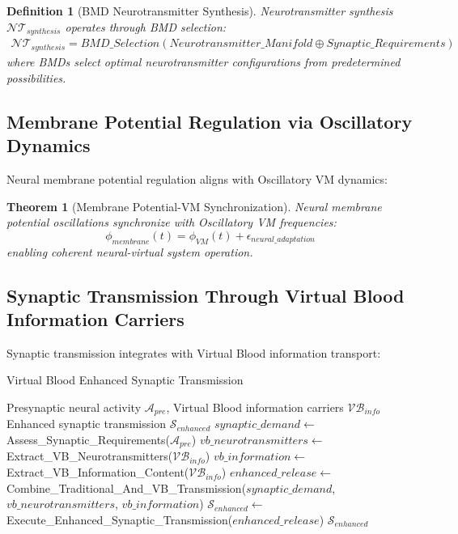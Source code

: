 \documentclass[12pt,a4paper]{article}
\newtheorem{theorem}{Theorem}
\newtheorem{definition}{Definition}
\begin{document}
\begin{definition}[BMD Neurotransmitter Synthesis]
Neurotransmitter synthesis $\mathcal{NT}_{synthesis}$ operates through BMD selection:
\begin{align}
\mathcal{NT}_{synthesis} = BMD\_Selection(Neurotransmitter\_Manifold \oplus Synaptic\_Requirements)
\end{align}
where BMDs select optimal neurotransmitter configurations from predetermined possibilities.
\end{definition}

\subsection{Membrane Potential Regulation via Oscillatory Dynamics}

Neural membrane potential regulation aligns with Oscillatory VM dynamics:

\begin{theorem}[Membrane Potential-VM Synchronization]
Neural membrane potential oscillations synchronize with Oscillatory VM frequencies:
\begin{equation}
\phi_{membrane}(t) = \phi_{VM}(t) + \epsilon_{neural\_adaptation}
\end{equation}
enabling coherent neural-virtual system operation.
\end{theorem}

\subsection{Synaptic Transmission Through Virtual Blood Information Carriers}

Synaptic transmission integrates with Virtual Blood information transport:

\begin{algorithm}
\caption{Virtual Blood Enhanced Synaptic Transmission}
\begin{algorithmic}[1]
\REQUIRE Presynaptic neural activity $\mathcal{A}_{pre}$, Virtual Blood information carriers $\mathcal{VB}_{info}$
\ENSURE Enhanced synaptic transmission $\mathcal{S}_{enhanced}$
\STATE $synaptic\_demand \leftarrow$ Assess\_Synaptic\_Requirements($\mathcal{A}_{pre}$)
\STATE $vb\_neurotransmitters \leftarrow$ Extract\_VB\_Neurotransmitters($\mathcal{VB}_{info}$)
\STATE $vb\_information \leftarrow$ Extract\_VB\_Information\_Content($\mathcal{VB}_{info}$)
\STATE $enhanced\_release \leftarrow$ Combine\_Traditional\_And\_VB\_Transmission($synaptic\_demand$, $vb\_neurotransmitters$, $vb\_information$)
\STATE $\mathcal{S}_{enhanced} \leftarrow$ Execute\_Enhanced\_Synaptic\_Transmission($enhanced\_release$)
\RETURN $\mathcal{S}_{enhanced}$
\end{algorithmic}
\end{algorithm}
\end{document}
